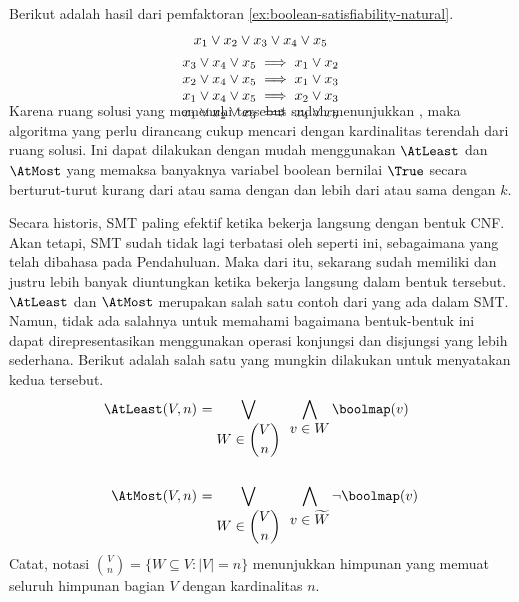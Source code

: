 \begin{example}
	Berikut adalah hasil dari pemfaktoran \autoref{ex:boolean-satisfiability-natural}.
	\[
		\smash[b]{
		\begin{array}{c}
			x_1 \vee x_2 \vee x_3 \vee x_4 \vee x_5 \\ [4pt]
			x_3 \vee x_4 \vee x_5 \implies x_1 \vee x_2 \\
			x_2 \vee x_4 \vee x_5 \implies x_1 \vee x_3 \\
			x_1 \vee x_4 \vee x_5 \implies x_2 \vee x_3 \\
			x_1 \vee x_2 \vee x_3 \implies x_4 \vee x_5
		\end{array}
		} \vspace{.5em}
	\]
	\label{ex:boolean-satisfiability}
\end{example}

Karena ruang solusi  yang memenuhi  tersebut sudah menunjukkan , maka algoritma yang perlu dirancang cukup mencari  dengan kardinalitas terendah dari ruang solusi. Ini dapat dilakukan dengan mudah menggunakan  \(\AtLeast\) dan \(\AtMost\) yang memaksa banyaknya variabel boolean bernilai \(\True\) secara berturut-turut kurang dari atau sama dengan dan lebih dari atau sama dengan \(k\).

Secara historis, SMT paling efektif ketika bekerja langsung dengan bentuk CNF. Akan tetapi, SMT  sudah tidak lagi terbatasi oleh  seperti ini, sebagaimana yang telah dibahasa pada Pendahuluan. Maka dari itu,  sekarang sudah memiliki  dan justru lebih banyak diuntungkan ketika bekerja langsung dalam bentuk tersebut.  \(\AtLeast\) dan \(\AtMost\) merupakan salah satu contoh dari  yang ada dalam SMT. Namun, tidak ada salahnya untuk memahami bagaimana bentuk-bentuk ini dapat direpresentasikan menggunakan operasi konjungsi dan disjungsi yang lebih sederhana. Berikut adalah salah satu  yang mungkin dilakukan untuk menyatakan kedua  tersebut.
\[
	\begin{array}{r@{\ }l}
		\AtLeast(V, n) &= \displaystyle \bigvee \limits_{\displaystyle W \in \binom{V}{n}} \enspace \bigwedge \limits_{\displaystyle v \in W} \boolmap(v) \\ [48pt]
		\AtMost(V, n) &= \displaystyle \bigvee \limits_{\displaystyle W \in \binom{V}{n}} \enspace \bigwedge \limits_{\displaystyle v \in \widetilde{W}} \neg \boolmap(v)
	\end{array}
\]
Catat, notasi \(\displaystyle \binom{V}{n} = \{W \subseteq V : |V| = n\}\) menunjukkan himpunan yang memuat seluruh himpunan bagian \(V\) dengan kardinalitas \(n\).

